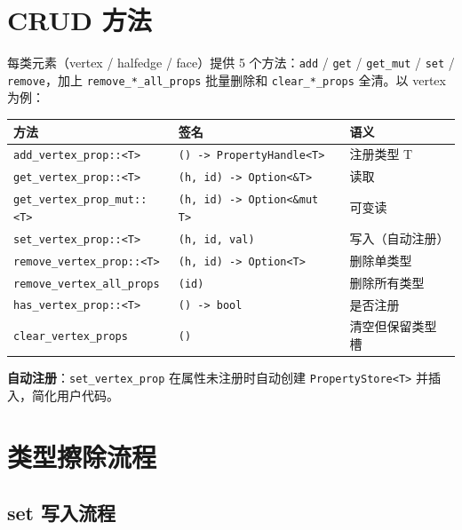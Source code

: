 \documentclass[11pt,a4paper]{article}
\begin{document}
\section{CRUD 方法}

每类元素（vertex / halfedge / face）提供 5 个方法：\texttt{add} / \texttt{get} /
\texttt{get\_mut} / \texttt{set} / \texttt{remove}，加上 \texttt{remove\_*\_all\_props}
批量删除和 \texttt{clear\_*\_props} 全清。以 vertex 为例：

\begin{center}
\renewcommand{\arraystretch}{1.18}
\begin{tabular}{@{}lll@{}}
  \toprule
  \textbf{方法} & \textbf{签名} & \textbf{语义} \\
  \midrule
  \texttt{add\_vertex\_prop::<T>} & \texttt{() -> PropertyHandle<T>} & 注册类型 T \\
  \texttt{get\_vertex\_prop::<T>} & \texttt{(h, id) -> Option<\&T>} & 读取 \\
  \texttt{get\_vertex\_prop\_mut::<T>} & \texttt{(h, id) -> Option<\&mut T>} & 可变读 \\
  \texttt{set\_vertex\_prop::<T>} & \texttt{(h, id, val)} & 写入（自动注册） \\
  \texttt{remove\_vertex\_prop::<T>} & \texttt{(h, id) -> Option<T>} & 删除单类型 \\
  \texttt{remove\_vertex\_all\_props} & \texttt{(id)} & 删除所有类型 \\
  \texttt{has\_vertex\_prop::<T>} & \texttt{() -> bool} & 是否注册 \\
  \texttt{clear\_vertex\_props} & \texttt{()} & 清空但保留类型槽 \\
  \bottomrule
\end{tabular}
\end{center}

\textbf{自动注册}：\texttt{set\_vertex\_prop} 在属性未注册时自动创建
\texttt{PropertyStore<T>} 并插入，简化用户代码。

\section{类型擦除流程}

\subsection{set 写入流程}
\end{document}

